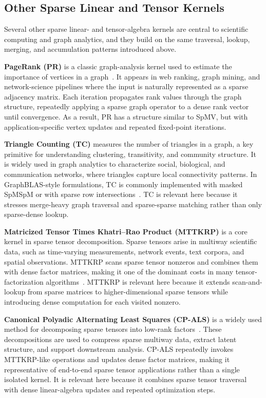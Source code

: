\subsection{Other Sparse Linear and Tensor Kernels} \label{sec:background-other-scientific-kernels} %

Several other sparse linear- and tensor-algebra kernels are central to scientific computing and graph analytics, and they build on the same traversal, lookup, merging, and accumulation patterns introduced above.

\noindent\textbf{PageRank (PR)} is a classic graph-analysis kernel used to estimate the importance of vertices in a graph~\cite{beamer2015arxiv}. It appears in web ranking, graph mining, and network-science pipelines where the input is naturally represented as a sparse adjacency matrix. Each iteration propagates rank values through the graph structure, repeatedly applying a sparse graph operator to a dense rank vector until convergence. As a result, PR has a structure similar to SpMV, but with application-specific vertex updates and repeated fixed-point iterations.

\noindent\textbf{Triangle Counting (TC)} measures the number of triangles in a graph, a key primitive for understanding clustering, transitivity, and community structure. It is widely used in graph analytics to characterize social, biological, and communication networks, where triangles capture local connectivity patterns. In GraphBLAS-style formulations, TC is commonly implemented with masked SpMSpM or with sparse row intersections~\cite{brock2022github,milakovic2022parallel}. TC is relevant here because it stresses merge-heavy graph traversal and sparse-sparse matching rather than only sparse-dense lookup.

\noindent\textbf{Matricized Tensor Times Khatri--Rao Product (MTTKRP)} is a core kernel in sparse tensor decomposition. Sparse tensors arise in multiway scientific data, such as time-varying measurements, network events, text corpora, and spatial observations. MTTKRP scans sparse tensor nonzeros and combines them with dense factor matrices, making it one of the dominant costs in many tensor-factorization algorithms~\cite{phipps2019software}. MTTKRP is relevant here because it extends scan-and-lookup from sparse matrices to higher-dimensional sparse tensors while introducing dense computation for each visited nonzero.

\noindent\textbf{Canonical Polyadic Alternating Least Squares (CP-ALS)} is a widely used method for decomposing sparse tensors into low-rank factors~\cite{phipps2019software}. These decompositions are used to compress sparse multiway data, extract latent structure, and support downstream analysis. CP-ALS repeatedly invokes MTTKRP-like operations and updates dense factor matrices, making it representative of end-to-end sparse tensor applications rather than a single isolated kernel. It is relevant here because it combines sparse tensor traversal with dense linear-algebra updates and repeated optimization steps.

